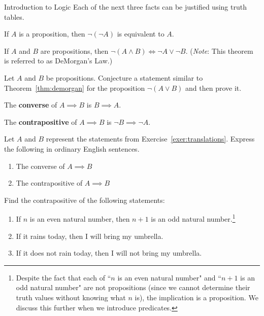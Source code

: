\begin{section}{Introduction to Logic}
Each of the next three facts can be justified using truth tables.

\begin{theorem}
If $A$ is a proposition, then $\neg(\neg A)$ is equivalent to $A$.
\end{theorem}

\begin{theorem}\label{thm:demorgan}
If $A$ and $B$ are propositions, then $\neg(A \wedge B) \iff \neg A \vee \neg B$.  (\emph{Note}: This theorem is referred to as DeMorgan's Law.)
\end{theorem}

\begin{problem}
Let $A$ and $B$ be propositions.  Conjecture a statement similar to Theorem~\ref{thm:demorgan} for the proposition $\neg(A\vee B)$ and then prove it.
\end{problem}

\begin{definition}\label{def:converse}
The \textbf{converse} of $A \implies B$ is $B \implies A$.
\end{definition}

\begin{definition}
The \textbf{contrapositive} of $A \implies B$ is $\neg B \implies \neg A$.
\end{definition}

\begin{exercise}
Let $A$ and $B$ represent the statements from Exercise~\ref{exer:translations}.  Express the following in ordinary English sentences.
\begin{enumerate}
\item The converse of $A \implies B$
\item The contrapositive of $A \implies B$
\end{enumerate}
\end{exercise}

\begin{exercise} Find the contrapositive of the following statements: 
\begin{enumerate}
\item If $n$ is an even natural number, then $n+1$ is an odd natural number.\footnote{Despite the fact that each of ``$n$ is an even natural number" and ``$n+1$ is an odd natural number" are not propositions (since we cannot determine their truth values without knowing what $n$ is), the implication is a proposition.  We discuss this further when we introduce predicates.}
\item If it rains today, then I will bring my umbrella.
\item If it does not rain today, then I will not bring my umbrella.
\end{enumerate} \end{exercise}


\end{section}
